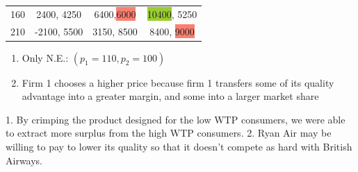 \documentclass[10pt,landscape]{article}
\newcommand{\Hint}[1]{\noindent{\textcolor{Orange}{#1}}}
\begin{document}
\begin{multicols}{4}
\begin{tabular}{clcc}
    \multicolumn{1}{c|}{160} & \multicolumn{1}{c|}{2400, 4250} & \multicolumn{1}{c|}{6400,\colorbox{Salmon}{6000}} & \multicolumn{1}{c|}{\colorbox{YellowGreen}{10400}, 5250} \\ \cline{2-4} 
    \multicolumn{1}{c|}{210} & \multicolumn{1}{c|}{-2100, 5500} & \multicolumn{1}{c|}{3150, 8500} & \multicolumn{1}{c|}{8400, \colorbox{Salmon}{9000}} \\ \cline{2-4} 
\end{tabular}
\begin{enumerate}[resume]
    \item Only N.E.: $(p_1 = 110, p_2 = 100)$
    \item Firm 1 chooses a higher price because firm 1 transfers some of its quality advantage into a greater margin,
        and some into a larger market share
\end{enumerate}

\Hint{Why would a company pay to make their product lower quality?} 1. By crimping the product designed for the low WTP
consumers, we were able to extract more surplus from the high WTP consumers.  2. Ryan Air may be willing to pay to lower
its quality so that it doesn't compete as hard with British Airways.


\end{multicols}
\end{document}
